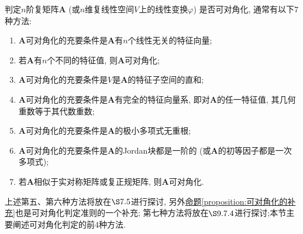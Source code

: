 \documentclass[../../main.tex]{subfiles}
\begin{document}
\begin{theorem}[可对角化的判定条件]\label{theorem:可对角化的判定条件}
判定\(n\)阶复矩阵\(\boldsymbol{A}\) (或\(n\)维复线性空间\(V\)上的线性变换\(\varphi\)) 是否可对角化, 通常有以下\(7\)种方法:
\begin{enumerate}[(1)]
\item  \(\boldsymbol{A}\)可对角化的充要条件是\(\boldsymbol{A}\)有\(n\)个线性无关的特征向量;

\item 若\(\boldsymbol{A}\)有\(n\)个不同的特征值, 则\(\boldsymbol{A}\)可对角化;

\item \(\boldsymbol{A}\)可对角化的充要条件是\(V\)是\(\boldsymbol{A}\)的特征子空间的直和;

\item \(\boldsymbol{A}\)可对角化的充要条件是\(\boldsymbol{A}\)有完全的特征向量系, 即对\(\boldsymbol{A}\)的任一特征值, 其几何重数等于其代数重数;

\item \(\boldsymbol{A}\)可对角化的充要条件是\(\boldsymbol{A}\)的极小多项式无重根;

\item \(\boldsymbol{A}\)可对角化的充要条件是\(\boldsymbol{A}\)的Jordan块都是一阶的 (或\(\boldsymbol{A}\)的初等因子都是一次多项式);

\item 若\(\boldsymbol{A}\)相似于实对称矩阵或复正规矩阵, 则\(\boldsymbol{A}\)可对角化.
\end{enumerate}
\end{theorem}
\begin{remark}
上述第五、第六种方法将放在\(\S7.5\)进行探讨, 另外\hyperref[proposition:可对角化的补充]{命题\ref{proposition:可对角化的补充}}也是可对角化判定准则的一个补充; 第七种方法将放在\(\S9.7.4\)进行探讨;本节主要阐述可对角化判定的前\(4\)种方法.
\end{remark}
\end{document}
